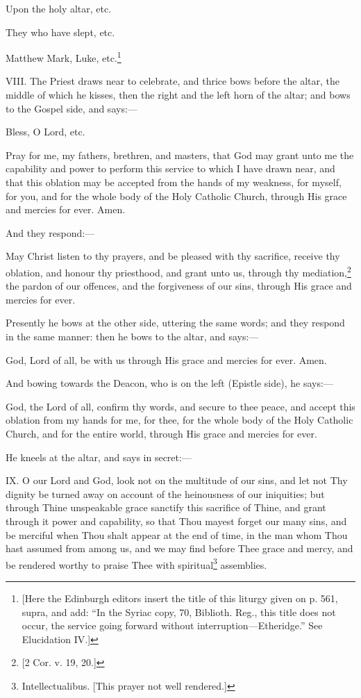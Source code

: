 Upon the holy altar, etc.

They who have slept, etc.

Matthew Mark, Luke, etc.\footnote{\par{}  [Here the Edinburgh editors insert the title of this liturgy given on p. 561, supra, and add: “In the Syriac copy, 70, Biblioth. Reg., this title does not occur, the service going forward without interruption—Etheridge.” See Elucidation IV.]}

VIII. The Priest draws near to celebrate, and thrice bows before the altar, the middle of which he kisses, then the right and the left horn of the altar; and bows to the Gospel side, and says:—

Bless, O Lord, etc.

Pray for me, my fathers, brethren, and masters, that God may grant unto me the capability and power to perform this service to which I have drawn near, and that this oblation may be accepted from the hands of my weakness, for myself, for you, and for the whole body of the Holy Catholic Church, through His grace and mercies for ever. Amen.

And they respond:—

May Christ listen to thy prayers, and be pleased with thy sacrifice, receive thy oblation, and honour thy priesthood, and grant unto us, through thy mediation,\footnote{\par{}  [2 Cor. v. 19, 20.]} the pardon of our offences, and the forgiveness of our sins, through His grace and mercies for ever.

Presently he bows at the other side, uttering the same words; and they respond in the same manner: then he bows to the altar, and says:—

God, Lord of all, be with us through His grace and mercies for ever. Amen.

And bowing towards the Deacon, who is on the left (Epistle side), he says:—

God, the Lord of all, confirm thy words, and secure to thee peace, and accept this oblation from my hands for me, for thee, for the whole body of the Holy Catholic Church, and for the entire world, through His grace and mercies for ever.

He kneels at the altar, and says in secret:—

IX. O our Lord and God, look not on the multitude of our sins, and let not Thy dignity be turned away on account of the heinousness of our iniquities; but through Thine unspeakable grace sanctify this sacrifice of Thine, and grant through it power and capability, so that Thou mayest forget our many sins, and be merciful when Thou shalt appear at the end of time, in the man whom Thou hast assumed from among us, and we may find before Thee grace and mercy, and be rendered worthy to praise Thee with spiritual\footnote{\par  Intellectualibus. [This prayer not well rendered.]} assemblies.

